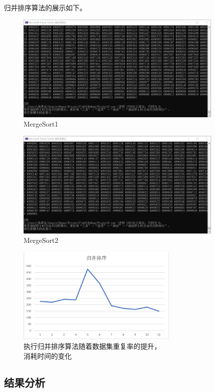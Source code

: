 \documentclass[UTF8]{ctexart}
\begin{document}
归并排序算法的展示如下。\par
\begin{figure}[H]
    \centering
    \includegraphics[width=0.9\textwidth]{merge1.png}
    \caption{MergeSort1}
\end{figure}
\begin{figure}[H]
    \centering
    \includegraphics[width=0.9\textwidth]{merge2.png}
    \caption{MergeSort2}
\end{figure}
\begin{figure}[H]
    \centering
    \includegraphics[width=0.7\textwidth]{figure2.png}
    \caption{执行归并排序算法随着数据集重复率的提升，\\消耗时间的变化}
\end{figure}
\subsection{结果分析}
\end{document}
